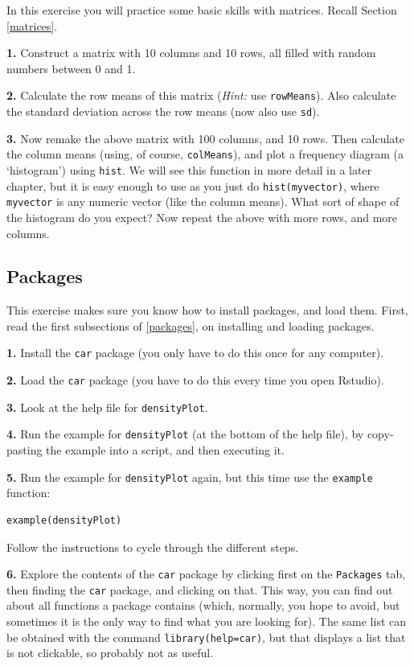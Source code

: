 \documentclass[]{book}
\begin{document}
In this exercise you will practice some basic skills with matrices. Recall Section \ref{matrices}.

\textbf{1.} Construct a matrix with 10 columns and 10 rows, all filled with random numbers between 0 and 1.

\textbf{2.} Calculate the row means of this matrix (\emph{Hint:} use \texttt{rowMeans}). Also calculate the standard deviation across the row means (now also use \texttt{sd}).

\textbf{3.} Now remake the above matrix with 100 columns, and 10 rows. Then calculate the column means (using, of course, \texttt{colMeans}), and plot a frequency diagram (a `histogram') using \texttt{hist}. We will see this function in more detail in a later chapter, but it is easy enough to use as you just do \texttt{hist(myvector)}, where \texttt{myvector} is any numeric vector (like the column means). What sort of shape of the histogram do you expect? Now repeat the above with more rows, and more columns.

\hypertarget{packages-1}{%
\subsection{Packages}\label{packages-1}}

This exercise makes sure you know how to install packages, and load them. First, read the first subsections of \ref{packages}, on installing and loading packages.

\textbf{1.} Install the \texttt{car} package (you only have to do this once for any computer).

\textbf{2.} Load the \texttt{car} package (you have to do this every time you open Rstudio).

\textbf{3.} Look at the help file for \texttt{densityPlot}.

\textbf{4.} Run the example for \texttt{densityPlot} (at the bottom of the help file), by copy-pasting the example into a script, and then executing it.

\textbf{5.} Run the example for \texttt{densityPlot} again, but this time use the \texttt{example} function:

\begin{verbatim}
example(densityPlot)
\end{verbatim}

Follow the instructions to cycle through the different steps.

\textbf{6.} Explore the contents of the \texttt{car} package by clicking first on the \texttt{Packages} tab, then finding the \texttt{car} package, and clicking on that. This way, you can find out about all functions a package contains (which, normally, you hope to avoid, but sometimes it is the only way to find what you are looking for). The same list can be obtained with the command \texttt{library(help=car)}, but that displays a list that is not clickable, so probably not as useful.
\end{document}

